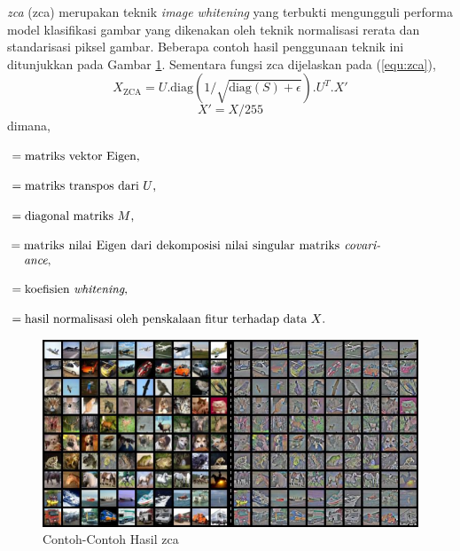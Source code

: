 \textit{\acrlong{zca}} (\acrshort{zca}) merupakan teknik \textit{image whitening} yang terbukti mengungguli performa model klasifikasi gambar yang dikenakan oleh teknik normalisasi rerata dan standarisasi piksel gambar. Beberapa contoh hasil penggunaan teknik ini ditunjukkan pada Gambar \ref{fig:contohhasilzca}. Sementara fungsi \acrshort{zca}  dijelaskan pada (\ref{equ:zca}),
\begin{equation}
    X_{\text{ZCA}} = U.\text{diag}(1/\sqrt{\text{diag}(S)+\epsilon}).U^T.X'
    \label{equ:zca}
\end{equation}
\begin{equation}
    X' = X/255
    \label{equ:normalisasi}
\end{equation}
dimana,
\begin{description}[align=parleft,labelwidth=2cm]
    \item[$U$] $= \parbox[t]{10.3cm}{matriks vektor Eigen,}$
    \item[$U^T$] $= \parbox[t]{10.3cm}{matriks transpos dari $U$,}$
    \item[diag($M$)] $= \parbox[t]{10.3cm}{diagonal matriks $M$,}$
    \item[$S$] $= \parbox[t]{10.3cm}{matriks nilai Eigen dari dekomposisi nilai singular matriks \textit{covariance},}$
    \item[$\epsilon$] $= \parbox[t]{10.3cm}{koefisien \textit{whitening},}$
    \item[$X'$] $= \parbox[t]{10.3cm}{hasil normalisasi oleh penskalaan fitur terhadap data $X$.}$
\end{description}
\begin{figure}[t]
    \centering
    \includegraphics[width=14cm]{gambar/contoh_zca.png}
    \caption[Contoh-Contoh Hasil \acrshort{zca}]{Contoh-Contoh Hasil \acrshort{zca} \protect{}}
    \label{fig:contohhasilzca}
\end{figure}

